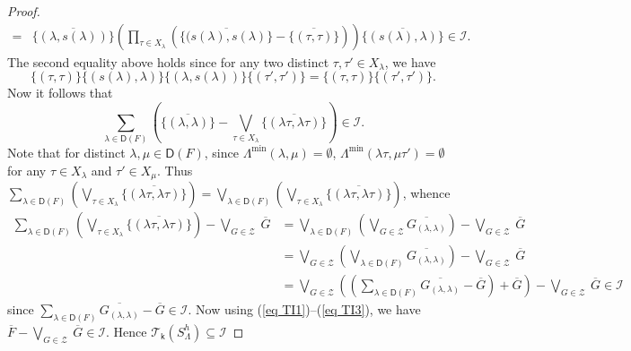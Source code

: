\documentclass[a4paper,reqno,11pt]{amsart}
\numberwithin{equation}{section}
\theoremstyle{definition}
\theoremstyle{remark}
\begin{document}
\begin{proof}
\begin{align*}
=&\overline{\{(\lambda,s(\lambda))\}}\left(\displaystyle{\prod_{\tau\in X_\lambda}}\left(\overline{\{(s(\lambda),s(\lambda)\}}-\overline{\{(\tau,\tau)\}}\right)\right)\overline{\{(s(\lambda),\lambda)\}}\in \mathcal{I}.
\end{align*}
The second equality above holds since for any two distinct $\tau,\tau'\in X_\lambda$, we have 
\[\{(\tau,\tau)\}\{(s(\lambda),\lambda)\}\{(\lambda,s(\lambda))\}\{(\tau',\tau')\}=\{(\tau,\tau)\}\{(\tau',\tau')\}.\]
Now it follows that 
\begin{equation}\label{eq:TI2}
\displaystyle{\sum_{\lambda\in \mathsf{D}(F)}}\left(\overline{\{(\lambda,\lambda)\}}-\displaystyle{\bigvee_{\tau\in X_\lambda}}\overline{\{(\lambda\tau,\lambda\tau)\}}\right)\in \mathcal{I}.
\end{equation}
Note that for distinct $\lambda,\mu\in \mathsf{D}(F)$, since $\Lambda^{\min}(\lambda,\mu)=\emptyset$, $\Lambda^{\min}(\lambda\tau,\mu\tau')=\emptyset$ for any $\tau\in X_\lambda$ and $\tau'\in X_\mu$. Thus $\displaystyle{\sum_{\lambda\in \mathsf{D}(F)}}\left(\displaystyle{\bigvee_{\tau\in X_\lambda}}\overline{\{(\lambda\tau,\lambda\tau)\}}\right)=\displaystyle{\bigvee_{\lambda\in \mathsf{D}(F)}}\left(\displaystyle{\bigvee_{\tau\in X_\lambda}}\overline{\{(\lambda\tau,\lambda\tau)\}}\right)$, whence 
\begin{align}
\displaystyle{\sum_{\lambda\in \mathsf{D}(F)}}\left(\displaystyle{\bigvee_{\tau\in X_\lambda}}\overline{\{(\lambda\tau,\lambda\tau)\}}\right)-\displaystyle{\bigvee_{G\in \mathcal{Z}}}~\overline{G}&=\displaystyle{\bigvee_{\lambda\in \mathsf{D}(F)}}\left(\displaystyle{\bigvee_{G\in \mathcal{Z}}}\overline{G_{(\lambda,\lambda)}}\right)-\displaystyle{\bigvee_{G\in \mathcal{Z}}}~\overline{G} \nonumber \\
&=\displaystyle{\bigvee_{G\in \mathcal{Z}}}\left(\displaystyle{\bigvee_{\lambda\in \mathsf{D}(F)}}\overline{G_{(\lambda,\lambda)}}\right)-\displaystyle{\bigvee_{G\in \mathcal{Z}}}~\overline{G} \nonumber\\
&=\displaystyle{\bigvee_{G\in \mathcal{Z}}}\left(\left(\displaystyle{\sum_{\lambda\in \mathsf{D}(F)}}\overline{G_{(\lambda,\lambda)}}-\overline{G}\right)+\overline{G}\right)-\displaystyle{\bigvee_{G\in \mathcal{Z}}}~\overline{G}\in \mathcal{I}
\label{eq TI3}
\end{align}
since $\displaystyle{\sum_{\lambda\in \mathsf{D}(F)}}\overline{G_{(\lambda,\lambda)}}-\overline{G}\in \mathcal{I}$. Now using (\ref{eq TI1})--(\ref{eq TI3}), we have $\overline{F}-\displaystyle{\bigvee_{G\in \mathcal{Z}}}~\overline{G}\in \mathcal{I}$. Hence $\mathcal{T}_\mathsf{k}(S_\Lambda^h)\subseteq \mathcal{I}$


\end{proof}
\end{document}
